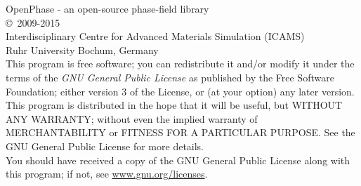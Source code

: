\null
\vfill
OpenPhase - an open-source phase-field library\\
\copyright~2009-2015\\
Interdisciplinary Centre for Advanced Materials Simulation (ICAMS)\\
Ruhr University Bochum, Germany\\

This program is free software; you can redistribute it and/or modify it under the terms of the \emph{GNU General Public License} as published by the Free Software Foundation; either version 3 of the License, or (at your option) any later version.\\

This program is distributed in the hope that it will be useful, but WITHOUT ANY WARRANTY; without even the implied warranty of MERCHANTABILITY or FITNESS FOR A PARTICULAR PURPOSE. See the GNU General Public License for more details.\\

You should have received a copy of the GNU General Public License along with this program; if not, see \href{http://www.gnu.org/licenses}{www.gnu.org/licenses}.
